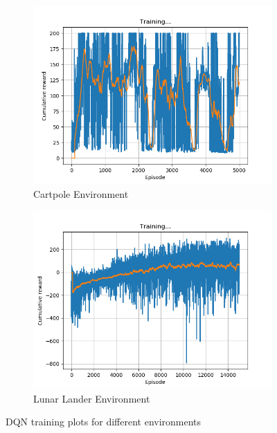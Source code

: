 \documentclass[a4paper]{article}
\begin{document}
\begin{figure}[h!]
    \centering
    \begin{subfigure}[b]{0.49\textwidth}
        \centering
        \includegraphics[width=\textwidth]{training_CartPole-v0.png}
        \caption{Cartpole Environment}
        \label{fig-cartpole-DQN}
    \end{subfigure}
    \begin{subfigure}[b]{0.49\textwidth}
        \centering
        \includegraphics[width=\textwidth]{training_LunarLander-v2.png}
        \caption{Lunar Lander Environment}
        \label{fig-lunar-DQN}
    \end{subfigure}
    \caption{DQN training plots for different environments}
    \label{fig-DQN}
\end{figure}
\end{document}
